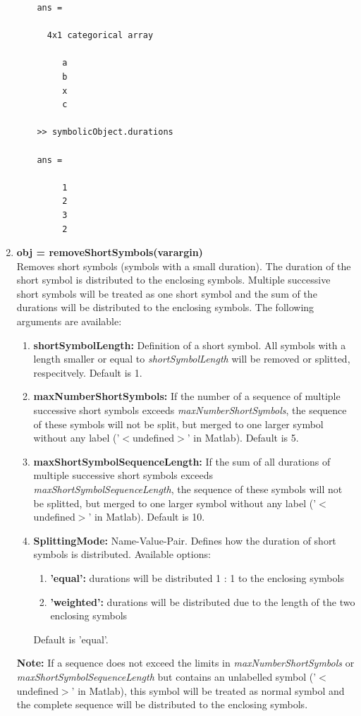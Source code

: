\documentclass[a4]{scrreprt}
\begin{document}
\begin{enumerate}
\begin{verbatim}
	ans = 
	
	  4x1 categorical array
	
	     a 
	     b 
	     x 
	     c 
	
	>> symbolicObject.durations
	
	ans =
	
	     1
	     2
	     3
	     2	
	\end{verbatim}
	
	\item \textbf{obj = removeShortSymbols(varargin)}\\
	Removes short symbols (symbols with a small duration). The duration of the short symbol is distributed to the enclosing symbols. Multiple successive short symbols will be treated as one short symbol and the sum of the durations will be distributed to the enclosing symbols. The following arguments are available:
	\begin{enumerate}
		\item \textbf{shortSymbolLength: } Definition of a short symbol. All symbols with a length smaller or equal to \textit{shortSymbolLength} will be removed or splitted, respecitvely. Default is 1.
		\item \textbf{maxNumberShortSymbols: } If the number of a sequence of multiple successive short symbols exceeds \textit{maxNumberShortSymbols}, the sequence of these symbols will not be split, but merged to one larger symbol without any label ('$<$undefined$>$' in Matlab). Default is 5.
		\item \textbf{maxShortSymbolSequenceLength: } If the sum of all durations of multiple successive short symbols exceeds \textit{maxShortSymbolSequenceLength}, the sequence of these symbols will not be splitted, but merged to one larger symbol without any label ('$<$undefined$>$' in Matlab). Default is 10.
		\item \textbf{SplittingMode: } Name-Value-Pair. Defines how the duration of short symbols is distributed. Available options: 
		\begin{enumerate}
			\item \textbf{'equal':} durations will be distributed 1 : 1 to the enclosing symbols
			\item \textbf{'weighted':} durations will be distributed due to the length of the two enclosing symbols
		\end{enumerate}
		Default is 'equal'.	
	\end{enumerate}

	\textbf{Note:} If a sequence does not exceed the limits in \textit{maxNumberShortSymbols} or \textit{maxShortSymbolSequenceLength} but contains an unlabelled symbol ('$<$undefined$>$' in Matlab), this symbol will be treated as normal symbol and the complete sequence will be distributed to the enclosing symbols.


\end{enumerate}
\end{document}
